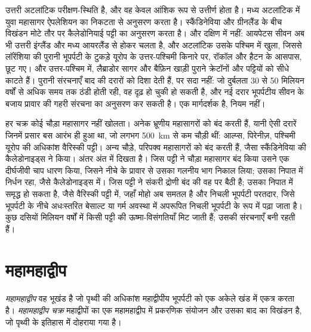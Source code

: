 उत्तरी अटलांटिक परीक्षण-स्थिति है, और वह केवल आंशिक रूप से उत्तीर्ण होता है। मध्य अटलांटिक में
युवा महासागर ऐपलेशियन का निकटता से अनुसरण करता है। स्कैंडिनेविया और ग्रीनलैंड के बीच विखंडन
मोटे तौर पर कैलेडोनियाई पट्टी का अनुसरण करता है। और दक्षिण में नहीं: आयपेटस सीवन अब भी
उत्तरी इंग्लैंड और मध्य आयरलैंड से होकर चलता है, और अटलांटिक उसके पश्चिम में खुला, जिससे
लॉरेंशिया की पुरानी भूपर्पटी के टुकड़े यूरोप के उत्तर-पश्चिमी किनारे पर, रॉकॉल और हैटन के आसपास, छूट गए।
और उत्तर-पश्चिम में, लैब्राडोर सागर और बैफ़िन खाड़ी पुराने क्रेटॉनों और पट्टियों को सीधे
काटते हैं। पुरानी संरचनाएँ बाद की दरारों को दिशा देती हैं, पर सदा नहीं: जो दुर्बलता
30 से 50 मिलियन वर्षों से अधिक समय तक ठंडी होती रही, वह दृढ़ हो चुकी हो सकती है, और नई दरार भूपर्पटीय सीवन के बजाय प्रावार की गहरी
संरचना का अनुसरण कर सकती है।  एक मार्गदर्शक है, नियम नहीं।

हर चक्र कोई चौड़ा महासागर नहीं खोलता। अनेक  भ्रूणीय महासागरों को बंद करती हैं, यानी ऐसी दरारें जिनमें
प्रसार बस आरंभ ही हुआ था, जो लगभग \qty{500}{km} से कम चौड़ी थीं: आल्प्स, पिरेनीज़, पश्चिमी यूरोप की
अधिकांश वैरिस्की पट्टी। अन्य चौड़े, परिपक्व महासागरों को बंद करती हैं, जैसा स्कैंडिनेविया की
कैलेडोनाइड्स ने किया। अंतर अंत में दिखता है। जिस पट्टी ने चौड़ा महासागर बंद किया उसने
एक दीर्घजीवी चाप धारण किया, जिसने नीचे के प्रावार से उसका गलनीय भाग निकाल लिया; उसका निपात
 में निर्धन रहा, जैसे कैलेडोनाइड्स में। जिस पट्टी ने संकरी द्रोणी बंद की वह  पर बैठी है; उसका
निपात  में समृद्ध हो सकता है, जैसे वैरिस्की पट्टी में, जहाँ मोहो अब समतल है और
निचली भूपर्पटी परतदार, जिसे भूपर्पटी के नीचे अधःस्तरित बेसाल्ट या गर्म अवस्था में अपरूपित निचली भूपर्पटी के रूप में
पढ़ा जाता है। कुछ दसियों मिलियन वर्षों में किसी पट्टी की ऊष्मा-विसंगतियाँ
मिट जाती हैं; उसकी संरचनाएँ बनी रहती हैं।

\section{महामहाद्वीप}\label{sec:b2:wilson-cycle:supercontinents}

\begin{definition}[महामहाद्वीप; महामहाद्वीप चक्र]\label{def:b2:wilson-cycle:supercontinent}
\emph{महामहाद्वीप} वह भूखंड है जो पृथ्वी की अधिकांश
महाद्वीपीय भूपर्पटी को एक अकेले खंड में एकत्र करता है। \emph{महामहाद्वीप चक्र}
महाद्वीपों का एक महामहाद्वीप में प्रकरणिक संयोजन और उसका बाद का
विखंडन है, जो पृथ्वी के इतिहास में दोहराया गया है।
\end{definition}

